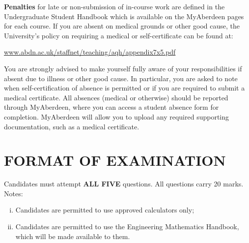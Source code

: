 \documentclass[12pts,a4paper,amsmath,amssymb,floatfix]{article}%
\begin{document}
{\bf Penalties} for late or non-submission of in-course work are defined in the Undergraduate Student Handbook which is available on the MyAberdeen pages for each course. If you are absent on medical grounds or other good cause, the University's policy on requiring a medical or self-certificate can be found at:
\begin{center}
\href{www.abdn.ac.uk/staffnet/teaching/aqh/appendix7x5.pdf}{www.abdn.ac.uk/staffnet/teaching/aqh/appendix7x5.pdf}
\end{center}
You are strongly advised to make yourself fully aware of your responsibilities if absent due to illness or other good cause. In particular, you are asked to note when self-certification of absence is permitted or if you are required to submit a medical certificate. All absences (medical or otherwise) should be reported through MyAberdeen, where you can access a student absence form for completion. MyAberdeen will allow you to upload any required supporting documentation, such as a medical certificate. 

\medskip


\section{FORMAT OF EXAMINATION}
Candidates must attempt {\bf ALL FIVE} questions. All questions carry 20 marks. Notes:
\begin{enumerate}[(i)]
\item Candidates are permitted to use approved calculators only;
\item Candidates are permitted to use the Engineering Mathematics Handbook, which will be made available to them.
\end{enumerate}

\medskip
\end{document}
